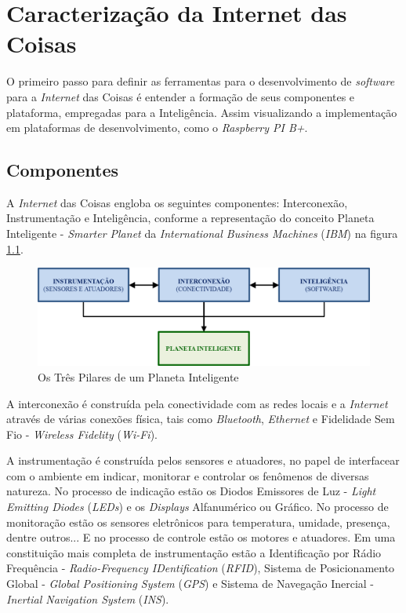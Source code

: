 %

\chapter{Caracterização da Internet das Coisas}

O primeiro passo para definir as ferramentas para o desenvolvimento de
\textit{software} para a \textit{Internet} das Coisas é entender a formação de
seus componentes e plataforma, empregadas para a Inteligência. Assim
visualizando a implementação em plataformas de desenvolvimento, como o
\textit{Raspberry PI B+}.

\section{Componentes}

A \textit{Internet} das Coisas engloba os seguintes componentes: Interconexão,
Instrumentação e Inteligência, conforme a representação do conceito Planeta
Inteligente - \textit{Smarter Planet} da \textit{International Business
  Machines} (\textit{IBM}) na figura \ref{fig:pilares-da-iot}.

\begin{figure}[H]
    \centering
    \includegraphics[width=0.7\linewidth]{figuras/pilares-da-iot}
    \caption{Os Três Pilares de um Planeta Inteligente}
    \label{fig:pilares-da-iot}
\end{figure}

A interconexão é construída pela conectividade com as redes locais e a
\textit{Internet} através de várias conexões física, tais como
\textit{Bluetooth}, \textit{Ethernet} e Fidelidade Sem Fio - \textit{Wireless
  Fidelity} (\textit{Wi-Fi}).

A instrumentação é construída pelos sensores e atuadores, no papel de
interfacear com o ambiente em indicar, monitorar e controlar os fenômenos de
diversas natureza. No processo de indicação estão os Diodos Emissores de Luz -
\textit{Light Emitting Diodes} (\textit{LEDs}) e os \textit{Displays}
Alfanumérico ou Gráfico. No processo de monitoração estão os sensores
eletrônicos para temperatura, umidade, presença, dentre outros... E no processo
de controle estão os motores e atuadores. Em uma constituição mais completa de
instrumentação estão a Identificação por Rádio Frequência -
\textit{Radio-Frequency IDentification} (\textit{RFID}), Sistema de
Posicionamento Global - \textit{Global Positioning System} (\textit{GPS}) e
Sistema de Navegação Inercial - \textit{Inertial Navigation System}
(\textit{INS}).

